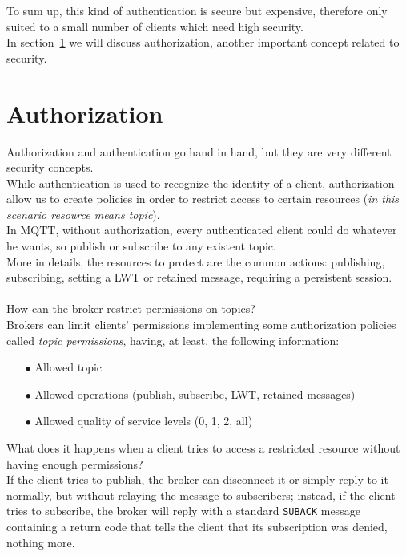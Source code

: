 \documentclass[12pt]{report}
\begin{document}
{To sum up, this kind of authentication is secure but expensive, therefore only suited to a small number of clients which need high security. \\

In section~\ref{sec:mqttauth} we will discuss authorization, another important concept related to security.\\


\section{Authorization}
\label{sec:mqttauth}
\bigskip
Authorization and authentication go hand in hand, but they are very different security concepts.\\
While authentication is used to recognize the identity of a client, authorization allow us to create policies in order to restrict access to certain resources (\emph{in this scenario resource means topic}).\\

In MQTT, without authorization, every authenticated client could do whatever he wants, so publish or subscribe to any existent topic.\\
More in details, the resources to protect are the common actions: publishing, subscribing, setting a LWT or retained message, requiring a persistent session.\\\\
How can the broker restrict permissions on topics?\\

Brokers can limit clients' permissions implementing some authorization policies called \emph{topic permissions}, having, at least, the following information:

\begin{itemize}
\setlength{\itemindent}{+4mm}
  \item[$\bullet$] Allowed topic
  \item[$\bullet$] Allowed operations (publish, subscribe, LWT, retained messages)
  \item[$\bullet$] Allowed quality of service levels (0, 1, 2, all)
\end{itemize}

What does it happens when a client tries to access a restricted resource without having enough permissions?\\

If the client tries to publish, the broker can disconnect it or simply reply to it normally, but without relaying the message to subscribers; instead, if the client tries to subscribe, the broker will reply with a standard \texttt{SUBACK} message containing a return code that tells the client that its subscription was denied, nothing more.\\

}
\end{document}
